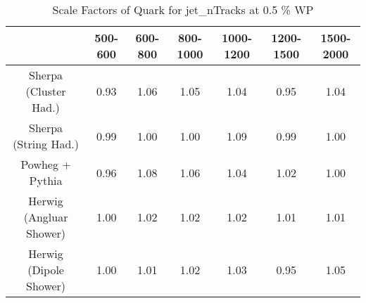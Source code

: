\begin{table}
\centering
\caption{Scale Factors of Quark for jet_nTracks at 0.5 \% WP}
\label{tab:SF_MC_jet_nTracks_0.5_Quark}
\begin{tabular}{ccccccc}
\toprule
{} &  500-600 &  600-800 &  800-1000 &  1000-1200 &  1200-1500 &  1500-2000 \\
\midrule
Sherpa (Cluster Had.)   &     0.93 &     1.06 &      1.05 &       1.04 &       0.95 &       1.04 \\
Sherpa (String Had.)    &     0.99 &     1.00 &      1.00 &       1.09 &       0.99 &       1.00 \\
Powheg + Pythia         &     0.96 &     1.08 &      1.06 &       1.04 &       1.02 &       1.00 \\
Herwig (Angluar Shower) &     1.00 &     1.02 &      1.02 &       1.02 &       1.01 &       1.01 \\
Herwig (Dipole Shower)  &     1.00 &     1.01 &      1.02 &       1.03 &       0.95 &       1.05 \\
\bottomrule
\end{tabular}
\end{table}
